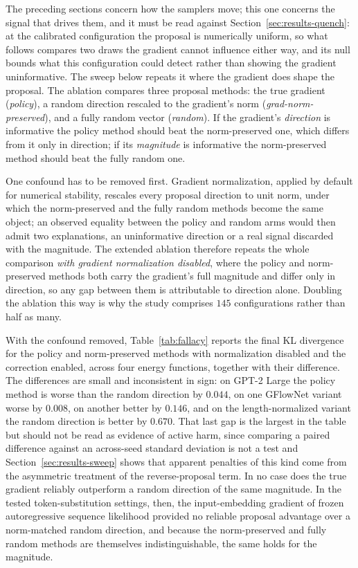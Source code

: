 The preceding sections concern how the samplers move; this one concerns the signal that drives them, and it must be read against Section~\ref{sec:results-quench}: at the calibrated configuration the proposal is numerically uniform, so what follows compares two draws the gradient cannot influence either way, and its null bounds what this configuration could detect rather than showing the gradient uninformative. The sweep below repeats it where the gradient does shape the proposal. The ablation compares three proposal methods: the true gradient (\emph{policy}), a random direction rescaled to the gradient's norm (\emph{grad-norm-preserved}), and a fully random vector (\emph{random}). If the gradient's \emph{direction} is informative the policy method should beat the norm-preserved one, which differs from it only in direction; if its \emph{magnitude} is informative the norm-preserved method should beat the fully random one.

One confound has to be removed first. Gradient normalization, applied by default for numerical stability, rescales every proposal direction to unit norm, under which the norm-preserved and the fully random methods become the same object; an observed equality between the policy and random arms would then admit two explanations, an uninformative direction or a real signal discarded with the magnitude. The extended ablation therefore repeats the whole comparison \emph{with gradient normalization disabled}, where the policy and norm-preserved methods both carry the gradient's full magnitude and differ only in direction, so any gap between them is attributable to direction alone. Doubling the ablation this way is why the study comprises $145$ configurations rather than half as many.

With the confound removed, Table~\ref{tab:fallacy} reports the final KL divergence for the policy and norm-preserved methods with normalization disabled and the correction enabled, across four energy functions, together with their difference.
The differences are small and inconsistent in sign: on GPT-2 Large the policy method is worse than the random direction by $0.044$, on one GFlowNet variant worse by $0.008$, on another better by $0.146$, and on the length-normalized variant the random direction is better by $0.670$. That last gap is the largest in the table but should not be read as evidence of active harm, since comparing a paired difference against an across-seed standard deviation is not a test and Section~\ref{sec:results-sweep} shows that apparent penalties of this kind come from the asymmetric treatment of the reverse-proposal term. In no case does the true gradient reliably outperform a random direction of the same magnitude. In the tested token-substitution settings, then, the input-embedding gradient of frozen autoregressive sequence likelihood provided no reliable proposal advantage over a norm-matched random direction, and because the norm-preserved and fully random methods are themselves indistinguishable, the same holds for the magnitude.

